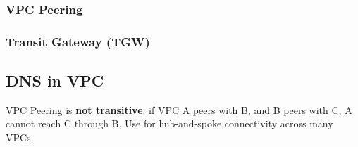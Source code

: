 \subsubsection{VPC Peering}

\subsubsection{Transit Gateway (TGW)}

\subsection{DNS in VPC}


\begin{saadepth}
\end{saadepth}

\begin{sapdepth}
\end{sapdepth}

\begin{examtip}
\end{examtip}

\begin{gotcha}
VPC Peering is \textbf{not transitive}: if VPC A peers with B, and B peers with C,
A cannot reach C through B. Use  for hub-and-spoke
connectivity across many VPCs.
\end{gotcha}
